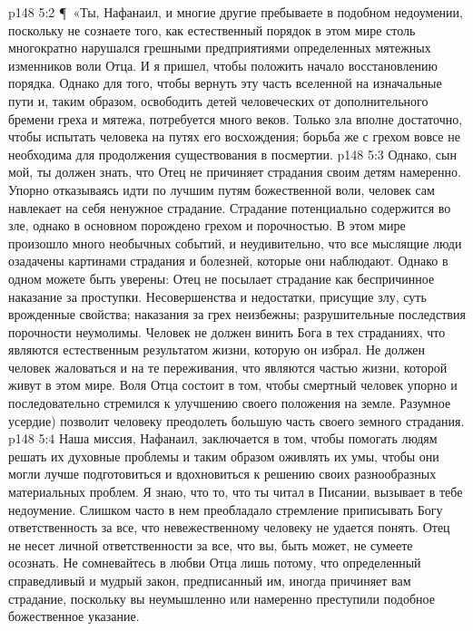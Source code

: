 \vs p148 5:2 \P\ «Ты, Нафанаил, и многие другие пребываете в подобном недоумении, поскольку не сознаете того, как естественный порядок в этом мире столь многократно нарушался грешными предприятиями определенных мятежных изменников воли Отца. И я пришел, чтобы положить начало восстановлению порядка. Однако для того, чтобы вернуть эту часть вселенной на изначальные пути и, таким образом, освободить детей человеческих от дополнительного бремени греха и мятежа, потребуется много веков. Только зла вполне достаточно, чтобы испытать человека на путях его восхождения; борьба же с грехом вовсе не необходима для продолжения существования в посмертии.
\vs p148 5:3 Однако, сын мой, ты должен знать, что Отец не причиняет страдания своим детям намеренно. Упорно отказываясь идти по лучшим путям божественной воли, человек сам навлекает на себя ненужное страдание. Страдание потенциально содержится во зле, однако в основном порождено грехом и порочностью. В этом мире произошло много необычных событий, и неудивительно, что все мыслящие люди озадачены картинами страдания и болезней, которые они наблюдают. Однако в одном можете быть уверены: Отец не посылает страдание как беспричинное наказание за проступки. Несовершенства и недостатки, присущие злу, суть врожденные свойства; наказания за грех неизбежны; разрушительные последствия порочности неумолимы. Человек не должен винить Бога в тех страданиях, что являются естественным результатом жизни, которую он избрал. Не должен человек жаловаться и на те переживания, что являются частью жизни, которой живут в этом мире. Воля Отца состоит в том, чтобы смертный человек упорно и последовательно стремился к улучшению своего положения на земле. Разумное усердие) позволит человеку преодолеть большую часть своего земного страдания.
\vs p148 5:4 Наша миссия, Нафанаил, заключается в том, чтобы помогать людям решать их духовные проблемы и таким образом оживлять их умы, чтобы они могли лучше подготовиться и вдохновиться к решению своих разнообразных материальных проблем. Я знаю, что то, что ты читал в Писании, вызывает в тебе недоумение. Слишком часто в нем преобладало стремление приписывать Богу ответственность за все, что невежественному человеку не удается понять. Отец не несет личной ответственности за все, что вы, быть может, не сумеете осознать. Не сомневайтесь в любви Отца лишь потому, что определенный справедливый и мудрый закон, предписанный им, иногда причиняет вам страдание, поскольку вы неумышленно или намеренно преступили подобное божественное указание.
